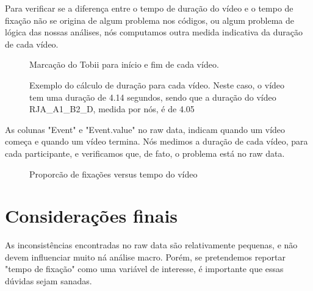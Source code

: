 \documentclass{article}
\begin{document}
Para verificar se a diferença entre o tempo de duração do vídeo e o tempo de fixação não se origina de algum problema nos códigos, ou algum problema de lógica das nossas análises, nós computamos outra medida indicativa da duração de cada vídeo.

\begin{figure}[]
  \caption{Marcação do Tobii para início e fim de cada vídeo.}
  \noindent{}
  \centering
\end{figure}

\begin{figure}[]
  \caption{Exemplo do cálculo de duração para cada vídeo. Neste caso, o vídeo tem uma duração de 4.14 segundos, sendo que a duração do vídeo RJA_A1_B2_D, medida por nós, é de 4.05}
  \noindent{}
  \centering
\end{figure}

As colunas "Event" e "Event.value" no raw data, indicam quando um vídeo começa e quando um vídeo termina. Nós medimos a duração de cada vídeo, para cada participante, e verificamos que, de fato, o problema está no raw data. 

\begin{figure}[]
\caption{Proporcão de fixações versus tempo do vídeo}
\noindent\makebox[\textwidth]{\texttt{[image: ./]}}
\centering
\end{figure}

\section{Considerações finais}

As inconsistências encontradas no raw data são relativamente pequenas, e não devem influenciar muito ná análise macro. Porém, se pretendemos reportar "tempo de fixação" como uma variável de interesse, é importante que essas dúvidas sejam sanadas.
\end{document}

